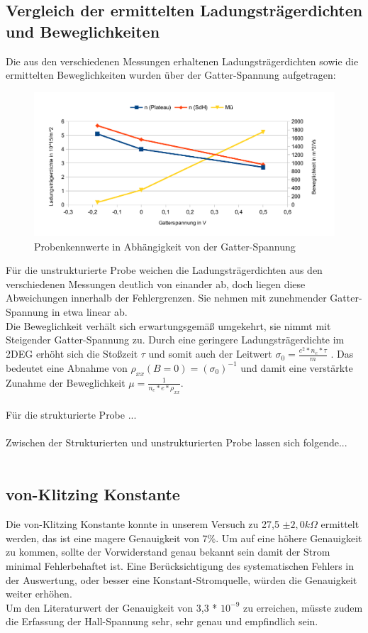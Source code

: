 \documentclass[10pt,a4paper]{article}
\begin{document}
	\subsection{Vergleich der ermittelten Ladungsträgerdichten und Beweglichkeiten}
	Die aus den verschiedenen Messungen erhaltenen Ladungsträgerdichten sowie die ermittelten Beweglichkeiten wurden über der Gatter-Spannung aufgetragen:
	\begin{figure}[H]
	\centering
	\caption{Probenkennwerte in Abhängigkeit von der Gatter-Spannung}
	\includegraphics[scale=0.5]{diagramm46_cropped.pdf}
	\end{figure}
	
	Für die unstrukturierte Probe weichen die Ladungsträgerdichten aus den verschiedenen Messungen deutlich von einander ab, doch liegen diese Abweichungen innerhalb der Fehlergrenzen. Sie nehmen mit zunehmender Gatter-Spannung in etwa linear ab.\\
	Die Beweglichkeit verhält sich erwartungsgemäß umgekehrt, sie nimmt mit Steigender Gatter-Spannung zu. Durch eine geringere Ladungsträgerdichte im 2DEG erhöht sich die Stoßzeit $ \tau $ und somit auch der Leitwert $ \sigma _0= \frac{e^2*n_e*\tau}{m} $ . Das bedeutet eine Abnahme von $ \rho_{xx}(B=0)=(\sigma _0)^{-1} $ und damit eine verstärkte Zunahme der Beweglichkeit $ \mu = \frac{1}{n_e*e*\rho _{xx}} $.\\ \\
	Für die strukturierte Probe ...\\ \\
	
	Zwischen der Strukturierten und unstrukturierten Probe lassen sich folgende...\\ \\
	\subsection{von-Klitzing Konstante}
	Die von-Klitzing Konstante konnte in unserem Versuch zu 27,5 $\pm 2,0 k\Omega $ ermittelt werden, das ist eine magere Genauigkeit von 7\%. Um auf eine höhere Genauigkeit zu kommen, sollte der Vorwiderstand genau bekannt sein damit der Strom minimal Fehlerbehaftet ist. Eine Berücksichtigung des systematischen Fehlers in der Auswertung, oder besser eine Konstant-Stromquelle, würden die Genauigkeit weiter erhöhen.\\
Um den Literaturwert der Genauigkeit von 3,3 * $ 10^{-9} $ zu erreichen, müsste zudem die Erfassung der Hall-Spannung sehr, sehr genau und empfindlich sein.\\
\end{document}
